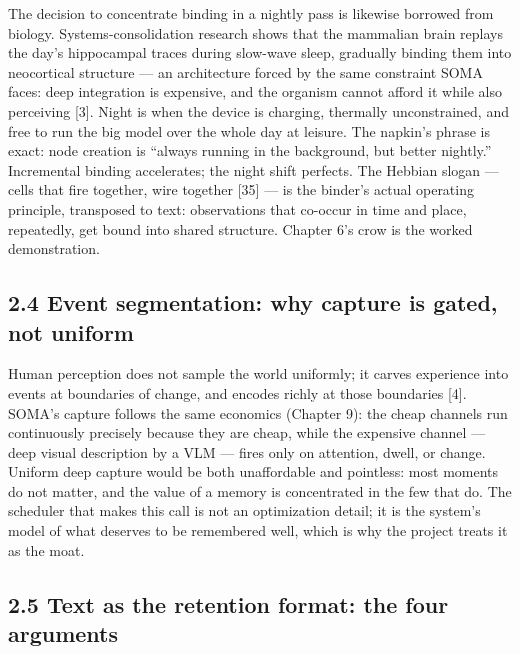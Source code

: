 The decision to concentrate binding in a nightly pass is likewise borrowed from biology. Systems-consolidation research shows that the mammalian brain replays the day's hippocampal traces during slow-wave sleep, gradually binding them into neocortical structure --- an architecture forced by the same constraint SOMA faces: deep integration is expensive, and the organism cannot afford it while also perceiving {[}3{]}. Night is when the device is charging, thermally unconstrained, and free to run the big model over the whole day at leisure. The napkin's phrase is exact: node creation is ``always running in the background, but better nightly.'' Incremental binding accelerates; the night shift perfects. The Hebbian slogan --- cells that fire together, wire together {[}35{]} --- is the binder's actual operating principle, transposed to text: observations that co-occur in time and place, repeatedly, get bound into shared structure. Chapter 6's crow is the worked demonstration.

\subsection{2.4 Event segmentation: why capture is gated, not uniform}\label{event-segmentation-why-capture-is-gated-not-uniform}

Human perception does not sample the world uniformly; it carves experience into events at boundaries of change, and encodes richly at those boundaries {[}4{]}. SOMA's capture follows the same economics (Chapter 9): the cheap channels run continuously precisely because they are cheap, while the expensive channel --- deep visual description by a VLM --- fires only on attention, dwell, or change. Uniform deep capture would be both unaffordable and pointless: most moments do not matter, and the value of a memory is concentrated in the few that do. The scheduler that makes this call is not an optimization detail; it is the system's model of what deserves to be remembered well, which is why the project treats it as the moat.

\subsection{2.5 Text as the retention format: the four arguments}\label{text-as-the-retention-format-the-four-arguments}

